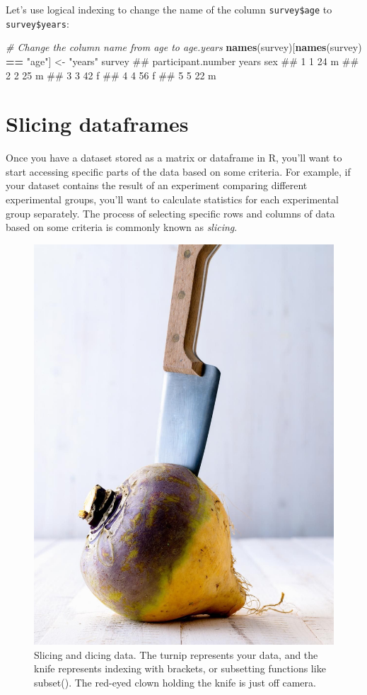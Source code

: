 \documentclass[]{book}
\newenvironment{Shaded}{\begin{snugshade}}{\end{snugshade}}
\newcommand{\KeywordTok}[1]{\textcolor[rgb]{0.13,0.29,0.53}{\textbf{#1}}}
\newcommand{\StringTok}[1]{\textcolor[rgb]{0.31,0.60,0.02}{#1}}
\newcommand{\CommentTok}[1]{\textcolor[rgb]{0.56,0.35,0.01}{\textit{#1}}}
\newcommand{\OperatorTok}[1]{\textcolor[rgb]{0.81,0.36,0.00}{\textbf{#1}}}
\newcommand{\NormalTok}[1]{#1}
\theoremstyle{definition}
\theoremstyle{definition}
\theoremstyle{remark}
\begin{document}
Let's use logical indexing to change the name of the column
\texttt{survey\$age} to \texttt{survey\$years}:

\begin{Shaded}
\begin{Highlighting}[]
\CommentTok{# Change the column name from age to age.years}
\KeywordTok{names}\NormalTok{(survey)[}\KeywordTok{names}\NormalTok{(survey) }\OperatorTok{==}\StringTok{ "age"}\NormalTok{] <-}\StringTok{ "years"}
\NormalTok{survey}
\NormalTok{##   participant.number years sex}
\NormalTok{## 1                  1    24   m}
\NormalTok{## 2                  2    25   m}
\NormalTok{## 3                  3    42   f}
\NormalTok{## 4                  4    56   f}
\NormalTok{## 5                  5    22   m}
\end{Highlighting}
\end{Shaded}

\section{Slicing dataframes}\label{slicing-dataframes}

Once you have a dataset stored as a matrix or dataframe in R, you'll
want to start accessing specific parts of the data based on some
criteria. For example, if your dataset contains the result of an
experiment comparing different experimental groups, you'll want to
calculate statistics for each experimental group separately. The process
of selecting specific rows and columns of data based on some criteria is
commonly known as \emph{slicing}.

\begin{figure}

{\centering \includegraphics[width=0.3\linewidth]{images/turnip} 

}

\caption{Slicing and dicing data. The turnip represents your data, and the knife represents indexing with brackets, or subsetting functions like subset(). The red-eyed clown holding the knife is just off camera.}\label{fig:unnamed-chunk-207}
\end{figure}
\end{document}
